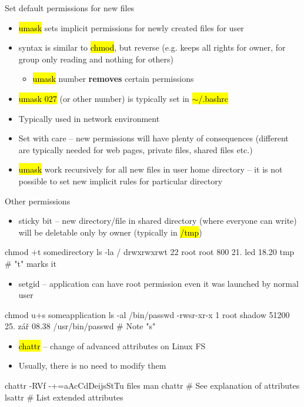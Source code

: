\documentclass[compress, ucs, xelatex, 11pt, xcolor=svgnames,
  hyperref={
    bookmarks=true,
    unicode=true,
    colorlinks=true,
    pdftitle={Linux, command line and MetaCentrum},
    plainpages=false,
    pdfauthor={Vojtech Zeisek},
    pdfsubject={Course about use of Linux command line, writing shell scripts and using MetaCentrum of CESNET},
    pdfcreator={XeLaTeX},
    pdfkeywords={Linux, GNU, BASH, shell, command line, MetaCentrum},
    linkcolor=Red,
    anchorcolor=Blue,
    citecolor=Purple,
    filecolor=DodgerBlue,
    menucolor=DarkOrchid,
    urlcolor=DeepSkyBlue,
    pdftex},
  url={hyphens, lowtilde} %
  ]{beamer}
\renewcommand{\texttt}[1]{\hl{\ttfamily #1}}
\begin{document}
\begin{frame}{Set default permissions for new files}
\begin{itemize}
  \item \texttt{umask} sets implicit permissions for newly created files for user
  \item syntax is similar to \texttt{chmod}, but reverse (e.g. \texttt{027} keeps all rights for owner, for group only reading and nothing for others)
  \begin{itemize}
    \item \texttt{umask} number \textbf{removes} certain permissions
  \end{itemize}
  \item \texttt{umask 027} (or other number) is typically set in \texttt{$\sim$/.bashrc}
  \item Typically used in network environment
  \item Set with care -- new permissions will have plenty of consequences (different are typically needed for web pages, private files, shared files etc.)
  \item \texttt{umask} work recursively for all new files in user home directory -- it is not possible to set new implicit rules for particular directory
\end{itemize}
\end{frame}

\begin{frame}[fragile]{Other permissions}
\begin{itemize}
  \item sticky bit -- new directory/file in shared directory (where everyone can write) will be deletable only by owner (typically in \texttt{/tmp})
\end{itemize}
  \begin{bashcode}
    chmod +t somedirectory
    ls -la /
    drwxrwxrwt 22 root root 800 21. led 18.20 tmp # "t" marks it
  \end{bashcode}
\begin{itemize}
  \item setgid -- application can have root permission even it was launched by normal user
\end{itemize}
  \begin{bashcode}
    chmod u+s someapplication
    ls -al /bin/passwd
    -rwsr-xr-x 1 root shadow 51200 25. zář 08.38 /usr/bin/passwd # Note "s"
  \end{bashcode}
\begin{itemize}
  \item \texttt{chattr} -- change of advanced attributes on Linux FS
  \item Usually, there is no need to modify them
\end{itemize}
  \begin{bashcode}
    chattr -RVf -+=aAcCdDeijsStTu files
    man chattr # See explanation of attributes
    lsattr # List extended attributes
  \end{bashcode}
\end{frame}
\end{document}
